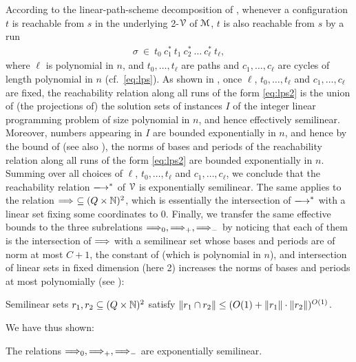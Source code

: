 According to the linear-path-scheme decomposition of 
\cite[Thm.~1]{Blondin15}, whenever 
a configuration $t$ is reachable from $s$
in the underlying 2-\vass $\mathcal{V}$ of $\mathcal{M}$,
$t$ is also reachable from $s$ by a run 
\begin{align} \label{eq:lps2}
\sigma \ \in \ 
t_0 \ c_1^{*} \ t_1 \ c_2^{*} \ \ldots \ c_\ell^{*} \ t_\ell,
\end{align}
where 
$\ell$ is polynomial in $n$, and
$t_0, \ldots, t_\ell$ are paths and $c_1, \ldots, c_\ell$ are cycles of
length polynomial in $n$ (cf.~\eqref{eq:lps}).
As shown in \cite{Blondin15},
once $\ell$, $t_0, \ldots, t_\ell$ and $c_1, \ldots, c_\ell$ are fixed, 
the reachability relation along all runs of the form \eqref{eq:lps2} 
is the union of (the projections of) the solution sets of instances $I$ 
of the integer linear programming problem of size polynomial in $n$, 
and hence effectively semilinear.
Moreover, numbers appearing in $I$ are bounded exponentially in
$n$, and hence by the bound of \cite{Pottier91}
(see also \cite[Prop.~4]{taming}), the norms of bases and periods
of the reachability relation along all runs of the form \eqref{eq:lps2}
are bounded exponentially in $n$.
Summing over all choices of $\ell$, $t_0, \ldots, t_\ell$ and 
$c_1, \ldots, c_\ell$, we conclude that
the reachability relation $\step^*$ of $\mathcal{V}$ is exponentially semilinear.
The same applies to the relation $\reachrel\ \subseteq(Q\times\N)^2$,
which is essentially the intersection of $\step^*$ with a linear set
fixing some coordinates to 0.
Finally, we transfer the same effective bounds to the three subrelations
$\Longrightarrow_{0}, \Longrightarrow_{+}, \Longrightarrow_{-}$ by noticing that each of them is
the intersection of $\Longrightarrow$ with a semilinear set
whose bases and periods are of norm at most $C+1$, the constant of
\Cref{lem:targetpump}
(which is polynomial in $n$),
and intersection of linear sets in fixed dimension (here 2) 
increases the norms of bases and periods at most polynomially
(see \cite[Thm.~6]{taming}):
\begin{claim} \label{claim:cap}
Semilinear sets $r_1,r_2\subseteq (Q\times\mathbb{N})^2$ satisfy
$\lVert r_1 \cap r_2\rVert \leq (O(1)+\lVert r_1\rVert \cdot \lVert r_2\rVert)^{O(1)}$.
\end{claim}
We have thus shown:

\begin{claim} \label{claim:sl}
  The relations $\Longrightarrow_{0}, \Longrightarrow_{+}, \Longrightarrow_{-}$ are exponentially semilinear.
\end{claim}

